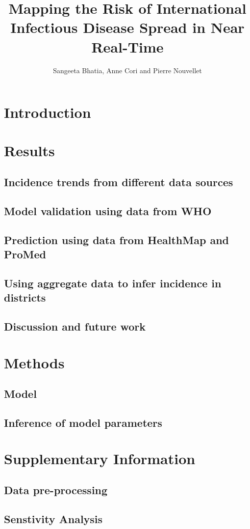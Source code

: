 \documentclass[a4paper,12pt]{article}
\begin{document}
\title{Mapping the Risk of International Infectious Disease Spread in
  Near Real-Time}
\author{Sangeeta Bhatia, Anne Cori and Pierre Nouvellet}
\maketitle

\begin{abstract}
\end{abstract}
\section*{Introduction}
\section*{Results}
\subsection*{Incidence trends from different data sources}
\subsection*{Model validation using data from WHO}
\subsection*{Prediction using data from HealthMap and ProMed}
\subsection*{Using aggregate data to infer incidence in districts}
\subsection*{Discussion and future work}
\section*{Methods}
\subsection*{Model}
\subsection*{Inference of model parameters}
\section*{Supplementary Information}
\subsection*{Data pre-processing}
\subsection*{Senstivity Analysis}


\end{document}
